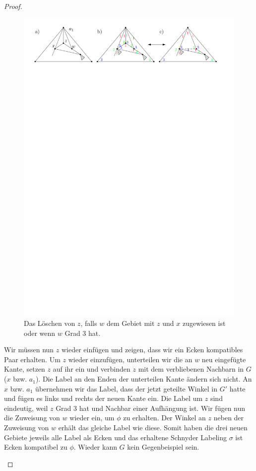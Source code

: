 \begin{proof}
\begin{description}[leftmargin =0pt, font = \rmfamily ]
\begin{figure}[h]
	\centering
	  \includegraphics[width=1\textwidth]{lem5_5.pdf}
    	\caption{Das Löschen von $z$, falls $w$ dem Gebiet mit $z$ und $x$ zugewiesen ist oder wenn $w$ Grad 3 hat.}
    	\label{pic_lem5_5}
\end{figure}

Wir müssen nun $z$ wieder einfügen und zeigen, dass wir ein Ecken kompatibles Paar erhalten. Um $z$ wieder einzufügen, unterteilen wir die an $w$ neu eingefügte Kante, setzen $z$ auf ihr ein und verbinden $z$ mit dem verbliebenen Nachbarn in $G$ ($x$ bzw. $a_1$). Die Label an den Enden der unterteilen Kante ändern sich nicht. An $x$ bzw. $a_1$ übernehmen wir das Label, dass der jetzt geteilte Winkel in $G'$ hatte und fügen es links und rechts der neuen Kante ein. Die Label um $z$ sind eindeutig, weil $z$ Grad 3 hat und Nachbar einer Aufhängung ist. Wir fügen nun die Zuweisung von $w$ wieder ein, um $\phi$ zu erhalten. Der Winkel an $z$ neben der Zuweisung von $w$ erhält das gleiche Label wie diese. Somit haben die drei neuen Gebiete jeweils alle Label als Ecken und das erhaltene Schnyder Labeling $\sigma$ ist Ecken kompatibel zu $\phi$. Wieder kann $G$ kein Gegenbeispiel sein.


\end{description}
\end{proof}
